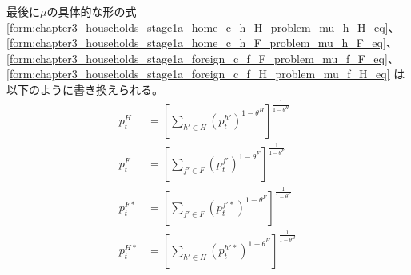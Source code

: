 最後に\(\mu\)の具体的な形の式
\eqref{form:chapter3_households_stage1a_home_c_h_H_problem_mu_h_H_eq}、
\eqref{form:chapter3_households_stage1a_home_c_h_F_problem_mu_h_F_eq}、
\eqref{form:chapter3_households_stage1a_foreign_c_f_F_problem_mu_f_F_eq}、
\eqref{form:chapter3_households_stage1a_foreign_c_f_H_problem_mu_f_H_eq}
は以下のように書き換えられる。
\begin{align}
    \label{form:chapter3_households_stage1a_ppi_descriptions_p_H_eq}
        p_t^H&=\left[\sum_{h'\in H}(p_t^{h'})^{1-\theta^H}\right]^{\frac{1}{1-\theta^H}} \\
    \label{form:chapter3_households_stage1a_ppi_descriptions_p_F_eq}
        p_t^F&=\left[\sum_{f'\in F}(p_t^{f'})^{1-\theta^F}\right]^{\frac{1}{1-\theta^F}} \\
    \label{form:chapter3_households_stage1a_ppi_descriptions_p_F_star_eq}
        p_t^{F*}&=\left[\sum_{f'\in F}(p_t^{f'*})^{1-\theta^F}\right]^{\frac{1}{1-\theta^F}} \\
    \label{form:chapter3_households_stage1a_ppi_descriptions_p_H_star_eq}
        p_t^{H*}&=\left[\sum_{h'\in H}(p_t^{h'*})^{1-\theta^H}\right]^{\frac{1}{1-\theta^H}}
\end{align}